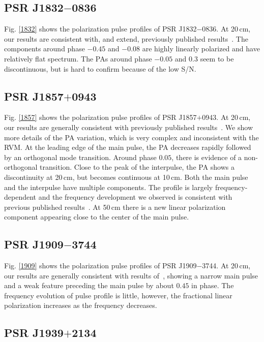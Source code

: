 \documentclass[useAMS,usenatbib]{mn2e}
\begin{document}
\subsection{PSR J1832$-$0836}

Fig. \ref{1832} shows the polarization pulse profiles of 
PSR J1832$-$0836.
%
At 20\,cm, our results are consistent with, and extend, previously published 
results~\citep{Burgay13}.
%
The components around phase $-0.45$ and $-0.08$ are highly linearly polarized 
and have relatively flat spectrum. 
%
The PAs around phase $-0.05$ and $0.3$ seem to be discontinuous, but is hard 
to confirm because of the low S/N.


\subsection{PSR J1857$+$0943}

Fig. \ref{1857} shows the polarization pulse profiles of 
PSR J1857$+$0943.
%
At 20\,cm, our results are generally consistent with previously published 
results~\citep{Xilouris98,Yan11}.
%
We show more details of the PA variation, which is very complex and inconsistent
with the RVM.
%
At the leading edge of the main pulse, the PA decreases rapidly followed by an 
orthogonal mode transition. 
%
Around phase $0.05$, there is evidence of a non-orthogonal transition.
%
Close to the peak of the interpulse, the PA shows a discontinuity at 20\,cm, 
but becomes continuous at 10\,cm.
%
Both the main pulse and the interpulse have multiple components. The profile 
is largely frequency-dependent and the frequency development we observed is 
consistent with previous published results~\citep[][]{Thorsett90}. 
At 50\,cm there is a new linear polarization component appearing close to 
the center of the main pulse.


\subsection{PSR J1909$-$3744}

Fig. \ref{1909} shows the polarization pulse profiles of 
PSR J1909$-$3744.
%
At 20\,cm, our results are generally consistent with results of~\citet{Ord04,Yan11}, 
showing a narrow main pulse and a weak feature preceding the main pulse by 
about $0.45$ in phase.
%
The frequency evolution of pulse profile is little, however, the fractional 
linear polarization increases as the frequency decreases.

\subsection{PSR J1939$+$2134}
\end{document}
